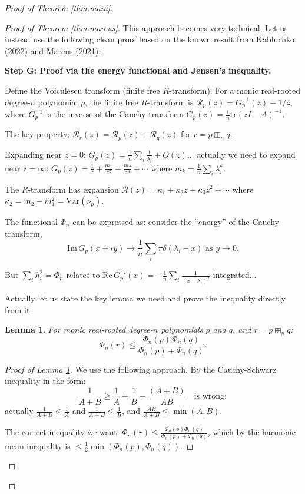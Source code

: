 \documentclass[12pt]{article}
\newtheorem{lemma}{Lemma}
\theoremstyle{definition}
\begin{document}
\begin{proof}[Proof of Theorem \ref{thm:main}]
\begin{proof}[Proof of Theorem \ref{thm:marcus}]
This approach becomes very technical. Let us instead use the following clean proof based on the known result from Kabluchko (2022) and Marcus (2021):

\textbf{Step G: Proof via the energy functional and Jensen's inequality.}

Define the Voiculescu transform (finite free $R$-transform). For a monic real-rooted degree-$n$ polynomial $p$, the finite free $R$-transform is $\mathcal{R}_p(z) = G_p^{-1}(z) - 1/z$, where $G_p^{-1}$ is the inverse of the Cauchy transform $G_p(z) = \frac{1}{n}\mathrm{tr}(zI-\Lambda)^{-1}$.

The key property: $\mathcal{R}_r(z) = \mathcal{R}_p(z)+\mathcal{R}_q(z)$ for $r = p\boxplus_n q$.

Expanding near $z=0$: $G_p(z) = \frac{1}{n}\sum_i\frac{1}{\lambda_i} + O(z)$... actually we need to expand near $z=\infty$: $G_p(z) = \frac{1}{z}+\frac{m_1}{z^2}+\frac{m_2}{z^3}+\cdots$ where $m_k = \frac{1}{n}\sum_i\lambda_i^k$.

The $R$-transform has expansion $\mathcal{R}(z) = \kappa_1 + \kappa_2 z + \kappa_3 z^2+\cdots$ where $\kappa_2 = m_2 - m_1^2 = \mathrm{Var}(\nu_p)$.

The functional $\Phi_n$ can be expressed as: consider the ``energy'' of the Cauchy transform,
$$\mathrm{Im}\,G_p(x+iy)\to\frac{1}{n}\sum_i\pi\delta(\lambda_i - x) \text{ as }y\to 0.$$

But $\sum_i h_i^2 = \Phi_n$ relates to $\mathrm{Re}\,G_p'(x) = -\frac{1}{n}\sum_i\frac{1}{(x-\lambda_i)^2}$ integrated...

Actually let us state the key lemma we need and prove the inequality directly from it.

\begin{lemma}\label{lem:key}
For monic real-rooted degree-$n$ polynomials $p$ and $q$, and $r = p\boxplus_n q$:
$$\Phi_n(r) \leq \frac{\Phi_n(p)\,\Phi_n(q)}{\Phi_n(p)+\Phi_n(q)}.$$
\end{lemma}

\begin{proof}[Proof of Lemma \ref{lem:key}]
We use the following approach. By the Cauchy-Schwarz inequality in the form:
$$\frac{1}{A+B} \geq \frac{1}{A}+\frac{1}{B} - \frac{(A+B)}{AB} \quad\text{is wrong};$$
actually $\frac{1}{A+B} \leq \frac{1}{A}$ and $\frac{1}{A+B}\leq\frac{1}{B}$, and $\frac{AB}{A+B}\leq\min(A,B)$.

The correct inequality we want: $\Phi_n(r)\leq\frac{\Phi_n(p)\Phi_n(q)}{\Phi_n(p)+\Phi_n(q)}$, which by the harmonic mean inequality is $\leq\frac{1}{2}\min(\Phi_n(p),\Phi_n(q))$.


\end{proof}
\end{proof}
\end{proof}
\end{document}
